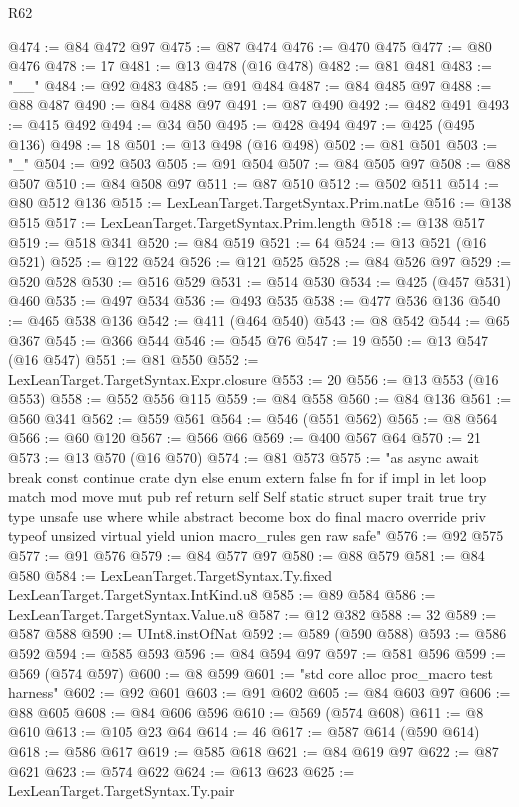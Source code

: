 \begin{lexlean}{R62}
\begin{coremodule}
@474 := @84 @472 @97
@475 := @87 @474
@476 := @470 @475
@477 := @80 @476
@478 := 17
@481 := @13 @478 (@16 @478)
@482 := @81 @481
@483 := "__"
@484 := @92 @483
@485 := @91 @484
@487 := @84 @485 @97
@488 := @88 @487
@490 := @84 @488 @97
@491 := @87 @490
@492 := @482 @491
@493 := @415 @492
@494 := @34 @50
@495 := @428 @494
@497 := @425 (@495 @136)
@498 := 18
@501 := @13 @498 (@16 @498)
@502 := @81 @501
@503 := "_"
@504 := @92 @503
@505 := @91 @504
@507 := @84 @505 @97
@508 := @88 @507
@510 := @84 @508 @97
@511 := @87 @510
@512 := @502 @511
@514 := @80 @512 @136
@515 := LexLeanTarget.TargetSyntax.Prim.natLe
@516 := @138 @515
@517 := LexLeanTarget.TargetSyntax.Prim.length
@518 := @138 @517
@519 := @518 @341
@520 := @84 @519
@521 := 64
@524 := @13 @521 (@16 @521)
@525 := @122 @524
@526 := @121 @525
@528 := @84 @526 @97
@529 := @520 @528
@530 := @516 @529
@531 := @514 @530
@534 := @425 (@457 @531) @460
@535 := @497 @534
@536 := @493 @535
@538 := @477 @536 @136
@540 := @465 @538 @136
@542 := @411 (@464 @540)
@543 := @8 @542
@544 := @65 @367
@545 := @366 @544
@546 := @545 @76
@547 := 19
@550 := @13 @547 (@16 @547)
@551 := @81 @550
@552 := LexLeanTarget.TargetSyntax.Expr.closure
@553 := 20
@556 := @13 @553 (@16 @553)
@558 := @552 @556 @115
@559 := @84 @558
@560 := @84 @136
@561 := @560 @341
@562 := @559 @561
@564 := @546 (@551 @562)
@565 := @8 @564
@566 := @60 @120
@567 := @566 @66
@569 := @400 @567 @64
@570 := 21
@573 := @13 @570 (@16 @570)
@574 := @81 @573
@575 := "as async await break const continue crate dyn else enum extern false fn for if impl in let loop match mod move mut pub ref return self Self static struct super trait true try type unsafe use where while abstract become box do final macro override priv typeof unsized virtual yield union macro_rules gen raw safe"
@576 := @92 @575
@577 := @91 @576
@579 := @84 @577 @97
@580 := @88 @579
@581 := @84 @580
@584 := LexLeanTarget.TargetSyntax.Ty.fixed LexLeanTarget.TargetSyntax.IntKind.u8
@585 := @89 @584
@586 := LexLeanTarget.TargetSyntax.Value.u8
@587 := @12 @382
@588 := 32
@589 := @587 @588
@590 := UInt8.instOfNat
@592 := @589 (@590 @588)
@593 := @586 @592
@594 := @585 @593
@596 := @84 @594 @97
@597 := @581 @596
@599 := @569 (@574 @597)
@600 := @8 @599
@601 := "std core alloc proc_macro test harness"
@602 := @92 @601
@603 := @91 @602
@605 := @84 @603 @97
@606 := @88 @605
@608 := @84 @606 @596
@610 := @569 (@574 @608)
@611 := @8 @610
@613 := @105 @23 @64
@614 := 46
@617 := @587 @614 (@590 @614)
@618 := @586 @617
@619 := @585 @618
@621 := @84 @619 @97
@622 := @87 @621
@623 := @574 @622
@624 := @613 @623
@625 := LexLeanTarget.TargetSyntax.Ty.pair

\end{coremodule}
\end{lexlean}
